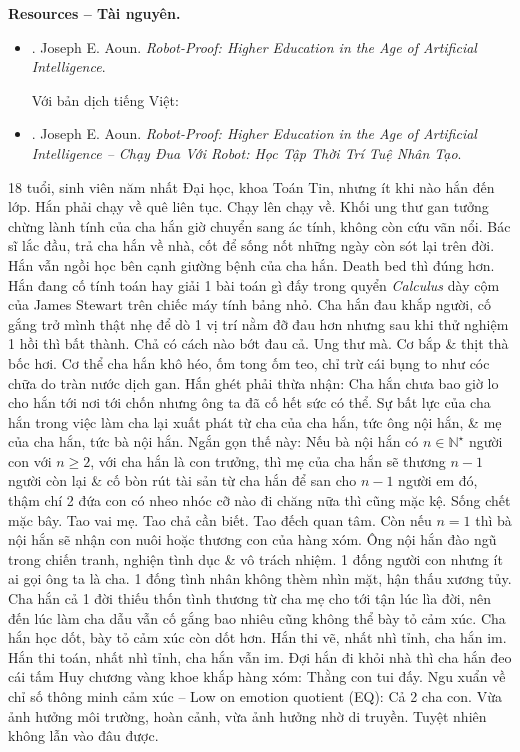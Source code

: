 \documentclass[12pt]{article}
\begin{document}
\noindent\textbf{\textsf{Resources -- Tài nguyên.}}
\begin{itemize}
	\item \cite{Aoun_robot-proof}. {\sc Joseph E. Aoun}. {\it Robot-Proof: Higher Education in the Age of Artificial Intelligence}.
	
	Với bản dịch tiếng Việt:
	\item \cite{Aoun_robot-proof_VN}. {\sc Joseph E. Aoun}. {\it Robot-Proof: Higher Education in the Age of Artificial Intelligence -- Chạy Đua Với Robot: Học Tập Thời Trí Tuệ Nhân Tạo}.
\end{itemize}
18 tuổi, sinh viên năm nhất Đại học, khoa Toán Tin, nhưng ít khi nào hắn đến lớp. Hắn phải chạy về quê liên tục. Chạy lên chạy về. Khối ung thư gan tưởng chừng lành tính của cha hắn giờ chuyển sang ác tính, không còn cứu vãn nổi. Bác sĩ lắc đầu, trả cha hắn về nhà, cốt để sống nốt những ngày còn sót lại trên đời. Hắn vẫn ngồi học bên cạnh giường bệnh của cha hắn. Death bed thì đúng hơn. Hắn đang cố tính toán hay giải 1 bài toán gì đấy trong quyển {\it Calculus} dày cộm của {\sc James Stewart} trên chiếc máy tính bảng nhỏ. Cha hắn đau khắp người, cố gắng trở mình thật nhẹ để dò 1 vị trí nằm đỡ đau hơn nhưng sau khi thử nghiệm 1 hồi thì bất thành. Chả có cách nào bớt đau cả. Ung thư mà. Cơ bắp \& thịt thà bốc hơi. Cơ thể cha hắn khô héo, ốm tong ốm teo, chỉ trừ cái bụng to như cóc chữa do tràn nước dịch gan. Hắn ghét phải thừa nhận: Cha hắn chưa bao giờ lo cho hắn tới nơi tới chốn nhưng ông ta đã cố hết sức có thể. Sự bất lực của cha hắn trong việc làm cha lại xuất phát từ cha của cha hắn, tức ông nội hắn, \& mẹ của cha hắn, tức bà nội hắn. Ngắn gọn thế này: Nếu bà nội hắn có $n\in\mathbb{N}^\star$ người con với $n\ge2$, với cha hắn là con trưởng, thì mẹ của cha hắn sẽ thương $n - 1$ người còn lại \& cố bòn rút tài sản từ cha hắn để san cho $n - 1$ người em đó, thậm chí 2 đứa con có nheo nhóc cỡ nào đi chăng nữa thì cũng mặc kệ. Sống chết mặc bây. Tao vai mẹ. Tao chả cần biết. Tao đếch quan tâm. Còn nếu $n = 1$ thì bà nội hắn sẽ nhận con nuôi hoặc thương con của hàng xóm. Ông nội hắn đào ngũ trong chiến tranh, nghiện tình dục \& vô trách nhiệm. 1 đống người con nhưng ít ai gọi ông ta là cha. 1 đống tình nhân không thèm nhìn mặt, hận thấu xương tủy. Cha hắn cả 1 đời thiếu thốn tình thương từ cha mẹ cho tới tận lúc lìa đời, nên đến lúc làm cha dẫu vẫn cố gắng bao nhiêu cũng không thể bày tỏ cảm xúc. Cha hắn học dốt, bày tỏ cảm xúc còn dốt hơn. Hắn thi vẽ, nhất nhì tỉnh, cha hắn im. Hắn thi toán, nhất nhì tỉnh, cha hắn vẫn im. Đợi hắn đi khỏi nhà thì cha hắn đeo cái tấm Huy chương vàng khoe khắp hàng xóm: Thằng con tui đấy. Ngu xuẩn về chỉ số thông minh cảm xúc -- Low on emotion quotient (EQ): Cả 2 cha con. Vừa ảnh hưởng môi trường, hoàn cảnh, vừa ảnh hưởng nhờ di truyền. Tuyệt nhiên không lẫn vào đâu được.
\end{document}
